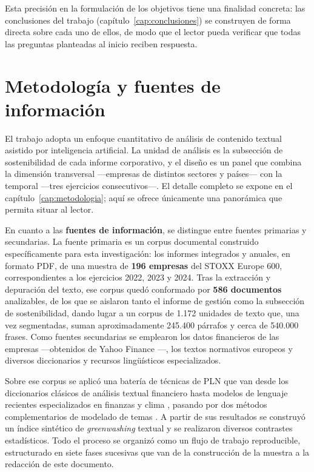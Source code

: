 Esta precisión en la formulación de los objetivos tiene una finalidad concreta: las conclusiones del
trabajo (capítulo~\ref{cap:conclusiones}) se construyen de
forma directa sobre cada uno de ellos, de modo que el lector pueda verificar que todas las
preguntas planteadas al inicio reciben respuesta.

\section{Metodología y fuentes de información}
\label{sec:metodologia-resumen}

El trabajo adopta un enfoque cuantitativo de análisis de contenido textual asistido por
inteligencia artificial. La unidad de análisis es la subsección de sostenibilidad de cada
informe corporativo, y el diseño es un panel que combina la dimensión transversal —empresas
de distintos sectores y países— con la temporal —tres ejercicios consecutivos—. El detalle
completo se expone en el capítulo~\ref{cap:metodologia}; aquí se ofrece
únicamente una panorámica que permita situar al lector.

En cuanto a las \textbf{fuentes de información}, se distingue entre fuentes primarias y
secundarias. La fuente primaria es un corpus documental construido específicamente para esta
investigación: los informes integrados y anuales, en formato PDF, de una muestra de
\textbf{196 empresas} del STOXX Europe 600, correspondientes a los ejercicios 2022, 2023 y
2024. Tras la extracción y depuración del texto, ese corpus quedó conformado por
\textbf{586 documentos} analizables, de los que se aislaron tanto el informe de gestión como
la subsección de sostenibilidad, dando lugar a un corpus de 1.172 unidades de texto
que, una vez segmentadas, suman aproximadamente 245.400 párrafos y cerca de
540.000 frases. Como fuentes secundarias se emplearon los datos financieros de las
empresas —obtenidos de Yahoo Finance \parencite{yfinance2024}—, los textos normativos
europeos \parencite{nfrd2014,csrd2022,esrs2023,taxonomia2020,sfdr2019} y diversos diccionarios
y recursos lingüísticos especializados.

Sobre ese corpus se aplicó una batería de técnicas de PLN que van desde los diccionarios
clásicos de análisis textual financiero \parencite{loughran2011} hasta modelos de lenguaje
recientes especializados en finanzas y clima \parencite{araci2019,webersinke2022}, pasando
por dos métodos complementarios de modelado de temas \parencite{blei2003,grootendorst2022}.
A partir de sus resultados se construyó un índice sintético de \textit{greenwashing} textual
y se realizaron diversos contrastes estadísticos. Todo el proceso se organizó como un flujo
de trabajo reproducible, estructurado en siete fases sucesivas que van de la construcción de
la muestra a la redacción de este documento.

